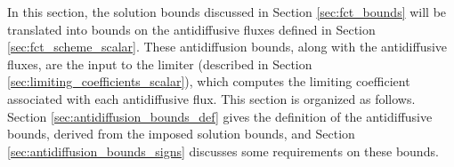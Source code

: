 In this section, the solution bounds discussed in Section \ref{sec:fct_bounds}
will be translated into bounds on the antidiffusive fluxes defined in
Section \ref{sec:fct_scheme_scalar}. These antidiffusion bounds, along
with the antidiffusive fluxes, are the input to the limiter (described
in Section \ref{sec:limiting_coefficients_scalar}), which computes
the limiting coefficient associated with each antidiffusive flux.
This section is organized as follows. Section \ref{sec:antidiffusion_bounds_def}
gives the definition of the antidiffusive bounds, derived from the
imposed solution bounds, and Section \ref{sec:antidiffusion_bounds_signs}
discusses some requirements on these bounds.
